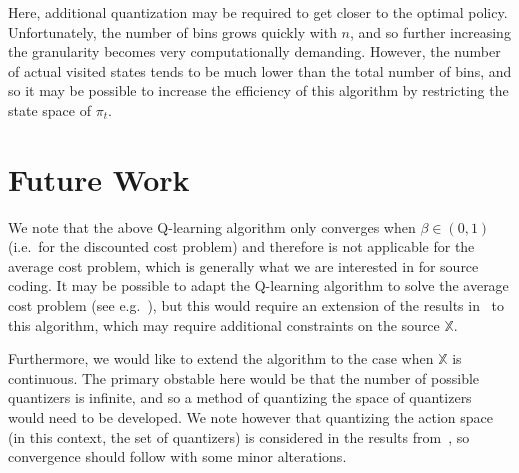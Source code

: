 \documentclass{article}
\begin{document}
Here, additional quantization may be required to get closer to the optimal policy. Unfortunately, the number of bins grows quickly with \(n\), and so further increasing the granularity becomes very computationally demanding. However, the number of actual visited states tends to be much lower than the total number of bins, and so it may be possible to increase the efficiency of this algorithm by restricting the state space of \(\pi_t\).

\section{Future Work}
We note that the above Q-learning algorithm only converges when \( \beta \in (0,1) \) (i.e.\ for the discounted cost problem) and therefore is not applicable for the average cost problem, which is generally what we are interested in for source coding. It may be possible to adapt the Q-learning algorithm to solve the average cost problem (see e.g.\ \cite{Abounadi}), but this would require an extension of the results in~\cite{Kara} to this algorithm, which may require additional constraints on the source \( \mathbb{X} \).

Furthermore, we would like to extend the algorithm to the case when \( \mathbb{X} \) is continuous. The primary obstable here would be that the number of possible quantizers is infinite, and so a method of quantizing the space of quantizers would need to be developed. We note however that quantizing the action space (in this context, the set of quantizers) is considered in the results from~\cite{Kara}, so convergence should follow with some minor alterations.

\printbibliography %
\end{document}
